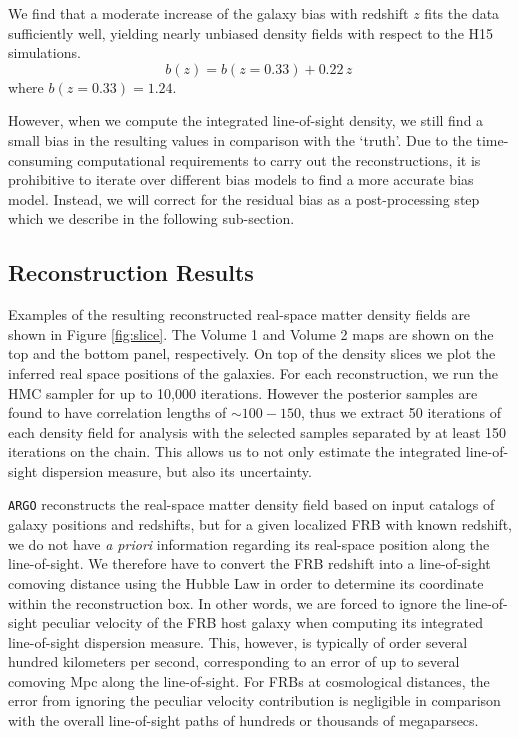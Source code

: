 \documentclass[twocolumn]{aastex63}
\newcommand{\argo}{\texttt{ARGO}}
\newcommand{\be}{\begin{equation}}
\newcommand{\ee}{\end{equation}}
\begin{document}
\begin{CJK*}{UTF8}{gbsn}
We find that a moderate increase of the galaxy bias with redshift $z$ fits the data sufficiently well, yielding nearly unbiased density fields with respect to the H15 simulations.
\be
b(z) = b(z=0.33) + 0.22\, z \,
\ee
where $b(z=0.33) = 1.24$. 

However, when we compute the integrated line-of-sight density, we still find a small bias in the resulting values in comparison with the `truth'. 
Due to the time-consuming computational requirements to carry out the reconstructions, it is 
prohibitive to iterate over different bias models to find a more accurate bias model. 
Instead, we will correct for the residual bias as a post-processing step which we describe in the following sub-section.

\subsection{Reconstruction Results}\label{sec:recon_results}
Examples of the resulting reconstructed real-space matter density fields are shown in Figure \ref{fig:slice}. The Volume 1 and Volume 2 maps are shown on the top and the bottom panel, respectively.
On top of the density slices we plot the inferred real space positions of the galaxies. For each reconstruction, we run the HMC sampler for up to 10,000 iterations. However 
the posterior samples are found to have correlation lengths of $\sim 100-150$, thus we extract 50 iterations of each density field for analysis with the
selected samples separated by at least 150 iterations on the chain. This allows us to not only estimate
the integrated line-of-sight dispersion measure, but also its uncertainty.

\argo{} reconstructs the real-space matter density field based on input catalogs of galaxy positions and redshifts, but for a given localized
FRB with known redshift, we do not have {\it a priori} information regarding its real-space position along the line-of-sight.
We therefore have to convert the FRB redshift into a line-of-sight comoving distance using the Hubble Law in order to determine its coordinate within the reconstruction box. 
In other words, we are forced to ignore the line-of-sight peculiar velocity of the FRB {host galaxy} when computing its integrated line-of-sight dispersion measure. This, however,
is typically of order several hundred kilometers per second, corresponding to an error of up to several comoving Mpc along the line-of-sight. 
For FRBs at cosmological distances, the error from ignoring the peculiar velocity contribution is negligible in comparison with the 
overall line-of-sight paths of hundreds or
thousands of megaparsecs.


\end{CJK*}
\end{document}
